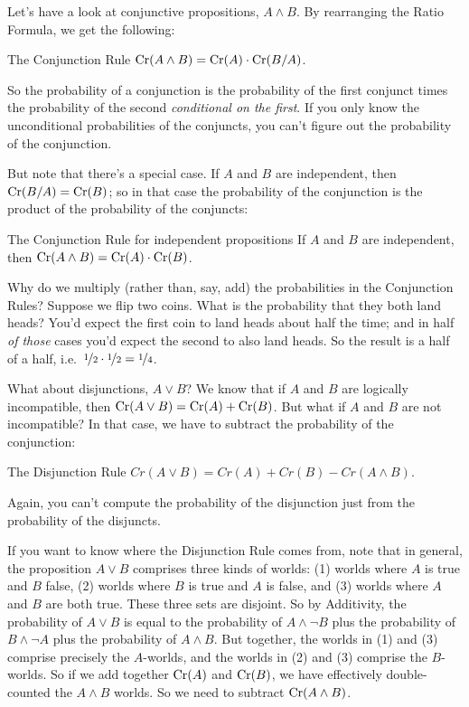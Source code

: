 Let's have a look at conjunctive propositions, $A \land B$. By
rearranging the Ratio Formula, we get the following:
%
\begin{genericthm}{The Conjunction Rule}
  $\text{Cr}(A \land B) = \text{Cr}(A) \cdot \text{Cr}(B / A)$.
\end{genericthm}
%
So the probability of a conjunction is the probability of the first
conjunct times the probability of the second \emph{conditional on the
  first}. If you only know the unconditional probabilities of the
conjuncts, you can't figure out the probability of the conjunction.

But note that there's a special case. If $A$ and $B$ are independent,
then $\text{Cr}(B/A) = \text{Cr}(B)$; so in that case the probability of the
conjunction is the product of the probability of the conjuncts:
%
\begin{genericthm}{The Conjunction Rule for independent propositions}
  If $A$ and $B$ are independent, then $\text{Cr}(A \land B) = \text{Cr}(A) \cdot
  \text{Cr}(B)$.
\end{genericthm}

Why do we multiply (rather than, say, add) the probabilities in the
Conjunction Rules? Suppose we flip two coins. What is the probability
that they both land heads? You'd expect the first coin to land heads
about half the time; and in half \emph{of those} cases you'd expect
the second to also land heads. So the result is a half of a half,
i.e.\ $\nicefrac{1}{2} \cdot \nicefrac{1}{2} = \nicefrac{1}{4}$.

What about disjunctions, $A \lor B$? We know that if $A$ and $B$ are
logically incompatible, then $\text{Cr}(A \lor B) = \text{Cr}(A) + \text{Cr}(B)$. But
what if $A$ and $B$ are not incompatible? In that case, we have to
subtract the probability of the conjunction:
%
\begin{genericthm}{The Disjunction Rule}
  $Cr(A \lor B) = Cr(A) + Cr(B) - Cr(A\land B)$.
\end{genericthm}
%
Again, you can't compute the probability of the disjunction just from
the probability of the disjuncts.

If you want to know where the Disjunction Rule comes from, note that
in general, the proposition $A\lor B$ comprises three kinds of worlds:
(1) worlds where $A$ is true and $B$ false, (2) worlds where $B$ is
true and $A$ is false, and (3) worlds where $A$ and $B$ are both
true. These three sets are disjoint. So by Additivity, the probability
of $A \lor B$ is equal to the probability of $A \land \neg B$ plus the
probability of $B \land \neg A$ plus the probability of $A \land
B$. But together, the worlds in (1) and (3) comprise precisely the
$A$-worlds, and the worlds in (2) and (3) comprise the $B$-worlds. So
if we add together $\text{Cr}(A)$ and $\text{Cr}(B)$, we have effectively
double-counted the $A \land B$ worlds. So we need to subtract $\text{Cr}(A
\land B)$.

